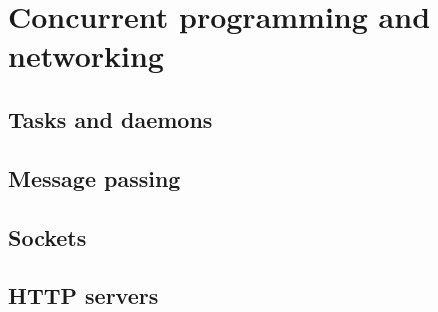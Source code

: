 
\chapter{Concurrent programming and networking}

\section{Tasks and daemons}

\section{Message passing}

\section{Sockets}

\section{HTTP servers}
